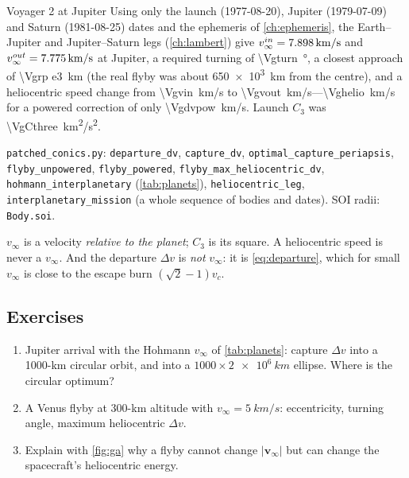 \documentclass[11pt,letterpaper,oneside]{report}
\newcommand{\dv}{\Delta v}
\newcommand{\vinf}{v_\infty}
\newcommand{\code}[1]{\texttt{#1}}
\newcommand{\bv}[1]{\bm{#1}}
\begin{document}
\begin{worked}{Voyager 2 at Jupiter}
Using only the launch (1977-08-20), Jupiter (1979-07-09) and Saturn (1981-08-25) dates and the
ephemeris of \cref{ch:ephemeris}, the Earth--Jupiter and Jupiter--Saturn legs (\cref{ch:lambert})
give $\vinf^{in}=\SI{\Vgvinfin}{km/s}$ and $\vinf^{out}=\SI{\Vgvinfout}{km/s}$ at Jupiter, a
required turning of \SI{\Vgturn}{\degree}, a closest approach of \SI{\Vgrp e3}{km} (the real
flyby was about \SI{650e3}{km} from the centre), and a heliocentric speed change from
\SI{\Vgvin}{km/s} to \SI{\Vgvout}{km/s}---\SI{\Vghelio}{km/s} for a powered correction of only
\SI{\Vgdvpow}{km/s}. Launch $C_3$ was \SI{\VgCthree}{km^2/s^2}.
\end{worked}

\begin{codebox}
\code{patched\_conics.py}: \code{departure\_dv}, \code{capture\_dv}, \code{optimal\_capture\_periapsis},
\code{flyby\_unpowered}, \code{flyby\_powered}, \code{flyby\_max\_heliocentric\_dv},
\code{hohmann\_interplanetary} (\cref{tab:planets}), \code{heliocentric\_leg},
\code{interplanetary\_mission} (a whole sequence of bodies and dates). SOI radii: \code{Body.soi}.
\end{codebox}

\begin{pitfall}
$\vinf$ is a velocity \emph{relative to the planet}; $C_3$ is its square. A heliocentric speed is
never a $\vinf$. And the departure $\dv$ is \emph{not} $\vinf$: it is \cref{eq:departure}, which for
small $\vinf$ is close to the escape burn $(\sqrt2-1)v_c$.
\end{pitfall}

\subsection*{Exercises}
\begin{enumerate}[label=3.\arabic*,nosep]
\item Jupiter arrival with the Hohmann $\vinf$ of \cref{tab:planets}: capture $\dv$ into a 1000-km circular orbit, and into a $1000\times\SI{2e6}{km}$ ellipse. Where is the circular optimum?
\item A Venus flyby at 300-km altitude with $\vinf=\SI{5}{km/s}$: eccentricity, turning angle, maximum heliocentric $\dv$.
\item Explain with \cref{fig:ga} why a flyby cannot change $|\bv\vinf|$ but can change the spacecraft's heliocentric energy.
\end{enumerate}
\end{document}
